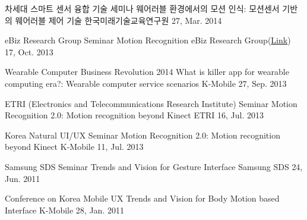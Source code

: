 


\begin{cventries}

  \cventry
    {차세대 스마트 센서 융합 기술 세미나} %
    {웨어러블 환경에서의 모션 인식: 모션센서 기반의 웨어러블 제어 기술} %
    {한국미래기술교육연구원} %
    {27, Mar. 2014} %
    {}

  \cventry
    {eBiz Research Group Seminar} %
    {Motion Recognition} %
    {eBiz Research Group(\href{http://www.dure.net/SIG.html}{Link})} %
    {17, Oct. 2013} %
    {}

  \cventry
    {Wearable Computer Business Revolution 2014} %
    {What is killer app for wearable computing era?: Wearable computer service scenarios} %
    {K-Mobile} %
    {27, Sep. 2013} %
    {}

  \cventry
    {ETRI (Electronics and Telecommunications Research Institute) Seminar} %
    {Motion Recognition 2.0: Motion recognition beyond Kinect} %
    {ETRI} %
    {16, Jul. 2013} %
    {}

  \cventry
    {Korea Natural UI/UX Seminar} %
    {Motion Recognition 2.0: Motion recognition beyond Kinect} %
    {K-Mobile} %
    {11, Jul. 2013} %
    {}

  \cventry
    {Samsung SDS Seminar} %
    {Trends and Vision for Gesture Interface} %
    {Samsung SDS} %
    {24, Jun. 2011} %
    {}
    
  \cventry
    {Conference on Korea Mobile UX} %
    {Trends and Vision for Body Motion based Interface} %
    {K-Mobile} %
    {28, Jan. 2011} %
    {}
\end{cventries}
